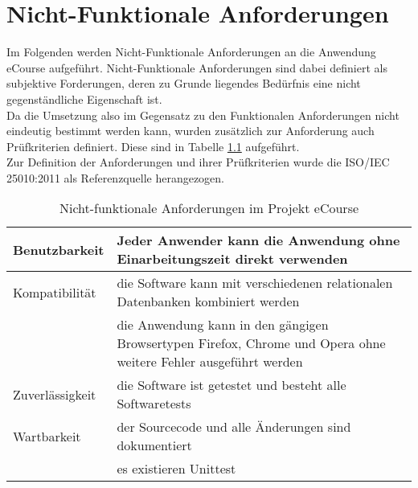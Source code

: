 \chapter{Nicht-Funktionale Anforderungen}
Im Folgenden werden Nicht-Funktionale Anforderungen an die Anwendung eCourse aufgeführt. Nicht-Funktionale Anforderungen sind dabei definiert als subjektive Forderungen, deren zu Grunde liegendes Bedürfnis eine nicht gegenständliche Eigenschaft ist. \\
Da die Umsetzung also im Gegensatz zu den Funktionalen Anforderungen nicht eindeutig bestimmt werden kann, wurden zusätzlich zur Anforderung auch Prüfkriterien definiert. Diese sind in Tabelle \ref{tab:nicht-funktionale_Anforderungen} aufgeführt. \\
Zur Definition der Anforderungen und ihrer Prüfkriterien wurde die ISO/IEC 25010:2011 als Referenzquelle herangezogen.

\begin{table}
\centering
	\begin{tabularx}{\textwidth}[H]{|X|X|}
		\hline
		Benutzbarkeit & Jeder Anwender kann die Anwendung ohne Einarbeitungszeit direkt verwenden \\
		\hline 
		Kompatibilität & die Software kann mit verschiedenen relationalen Datenbanken kombiniert werden \\
		\hline 
		\quad & die Anwendung kann in den gängigen Browsertypen Firefox, Chrome und Opera ohne weitere Fehler ausgeführt werden \\
		\hline
		Zuverlässigkeit & die Software ist getestet und besteht alle Softwaretests\\
		\hline
		Wartbarkeit & der Sourcecode und alle Änderungen sind dokumentiert \\
		\hline
		\quad & es existieren Unittest \\
		\hline
	\end{tabularx}
\caption{Nicht-funktionale Anforderungen im Projekt eCourse}
\label{tab:nicht-funktionale_Anforderungen}
\end{table}